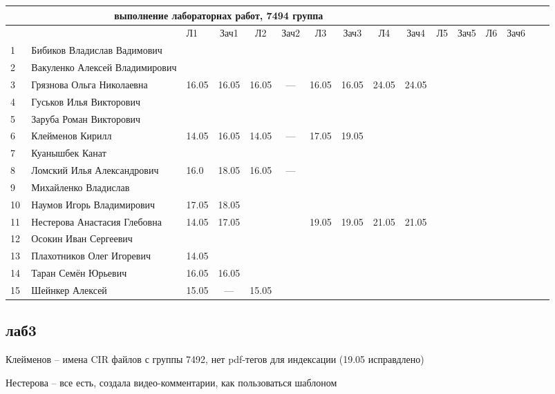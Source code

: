 \documentclass[a4paper,11pt]{article}
\begin{document}
\newpage
{}
\recalctypearea

%
\hspace{-6.1cm} %
\begin{tabular}{l|llccccccccccccc}
\multicolumn{10}{c}{выполнение лабораторнах работ, 7494 группа} \\
\toprule
&&Л1&Зач1& Л2&Зач2& Л3&Зач3& Л4&Зач4& Л5&Зач5& Л6&Зач6&\\ 
\midrule
1\,&Бибиков Владислав Вадимович    &&&&&&&&\\
2\,&Вакуленко Алексей Владимирович &&&&&&&&\\
3\,&Грязнова Ольга Николаевна      &16.05&16.05&16.05& --- &16.05&16.05&24.05&24.05\\
4\,&Гуськов Илья Викторович        &&&&&&&&\\
5\,&Заруба Роман Викторович        &&&&&&&&\\
\midrule
6\,&Клейменов Кирилл               &14.05&16.05&14.05& --- &17.05&19.05&&\\
7\,&Куанышбек Канат                &&&&&&&&\\
8\,&Ломский Илья Александрович     &16.0&18.05&16.05& --- &&&&\\
9\,&Михайленко Владислав           &&&&&&&&\\
10\,&Наумов Игорь Владимирович     &17.05&18.05&&&&&&\\
\midrule
11\,&Нестерова Анастасия Глебовна  &14.05&17.05& & &19.05&19.05&21.05&21.05\\
12\,&Осокин Иван Сергеевич         &&&&&&&&\\
13\,&Плахотников Олег Игоревич     &14.05&&&&&&&\\
14\,&Таран Семён Юрьевич           &16.05&16.05&&&&&&\\
15\,&Шейнкер Алексей               &15.05& --- &15.05&&&&&\\

\bottomrule
\end{tabular}

\newpage
{}
\recalctypearea
\subsection*{лаб3}

Клейменов -- имена CIR файлов с группы 7492, нет pdf-тегов для индексации (19.05 исправдлено)

Нестерова -- все есть, создала видео-комментарии, как пользоваться шаблоном
\end{document}

